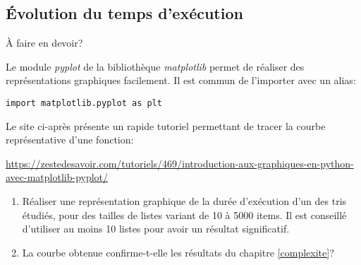 \documentclass[a4paper,11pt]{article}
\begin{document}
\begin{Form}
\subsection{Évolution du temps d'exécution}
\begin{commentprof}
À faire en devoir?
\end{commentprof}
Le module \emph{pyplot} de la bibliothèque \emph{matplotlib} permet de réaliser des représentations graphiques facilement. Il est commun de l'importer avec un alias:
\begin{lstlisting}
import matplotlib.pyplot as plt
\end{lstlisting}
Le site ci-après présente un rapide tutoriel permettant de tracer la courbe représentative d'une fonction:
\begin{center}
\url{https://zestedesavoir.com/tutoriels/469/introduction-aux-graphiques-en-python-avec-matplotlib-pyplot/}
\end{center}
\begin{activite}
\begin{enumerate}
\item Réaliser une représentation graphique de la durée d'exécution d'un des tris étudiés, pour des tailles de listes variant de 10 à 5000 items. Il est conseillé d'utiliser au moins 10 listes pour avoir un résultat significatif.
\item La courbe obtenue confirme-t-elle les résultats du chapitre \ref{complexite}?
\end{enumerate}
\end{activite}
\end{Form}
\end{document}
